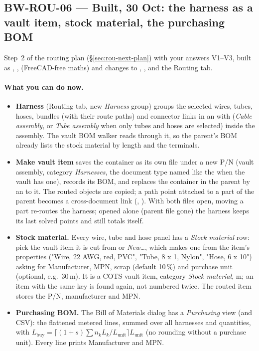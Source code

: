 \subsection{BW-ROU-06 --- Built, 30 Oct: the harness as a vault item, stock material, the purchasing BOM}\label{sec:rou06-built}

Step~2 of the routing plan (\S\ref{sec:rou-next-plan}) with your answers V1--V3, built as ,
,  (FreeCAD-free maths) and changes to ,
,  and the Routing tab.

\paragraph{What you can do now.}
\begin{itemize}[nosep]
  \item \textbf{Harness} (Routing tab, new \emph{Harness} group) groups the selected wires, tubes, hoses, bundles (with
        their route paths) and connector links in an  with  (\emph{Cable assembly}, or
        \emph{Tube assembly} when only tubes and hoses are selected) inside the assembly. The vault BOM walker reads
        through it, so the parent's BOM already lists the stock material by length and the terminals.
  \item \textbf{Make vault item} saves the container as its own file under a new P/N (vault assembly, category
        \emph{Harnesses}, the document type named like the  when the vault has one), records its BOM,
        and replaces the container in the parent by an  to it. The routed objects are copied; a path
        point attached to a part of the parent becomes a cross-document link (,
        ). With both files open, moving a part re-routes the harness; opened alone
        (parent file gone) the harness keeps its last solved points and still totals itself.
  \item \textbf{Stock material.} Every wire, tube and hose panel has a \emph{Stock material} row: pick the vault item
        it is cut from or \emph{New\ldots}, which makes one from the item's properties ("Wire, 22 AWG, red, PVC",
        "Tube, 8 x 1, Nylon", "Hose, 6 x 10") asking for Manufacturer, MPN, scrap (default 10\,\%) and purchase unit
        (optional, e.g.\ 30\,m). It is a COTS vault item, category \emph{Stock material},  m; an
        item with the same key is found again, not numbered twice. The routed item stores the P/N, manufacturer and MPN.
  \item \textbf{Purchasing BOM.} The Bill of Materials dialog has a \emph{Purchasing} view (and CSV): the flattened
        metered lines, summed over all harnesses and quantities, with
        $L_{\text{buy}}=\lceil (1+s)\sum n_kL_k/L_{\text{unit}}\rceil L_{\text{unit}}$ (no rounding without a purchase
        unit). Every line prints Manufacturer and MPN.
\end{itemize}

